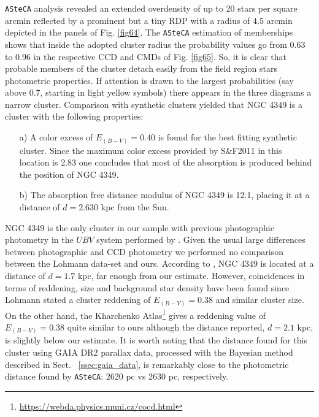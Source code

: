 \documentclass{aa}
\begin{document}
\texttt{ASteCA} analysis revealed an extended overdensity of up to 20 stars per
square arcmin reflected by a prominent but a tiny RDP with a radius of 4.5
arcmin depicted in the panels of Fig. \ref{fig64}.
The \texttt{ASteCA} estimation of memberships shows that inside the adopted
cluster radius the probability values go from 0.63 to 0.96 in the respective CCD
and CMDs of Fig. \ref{fig65}. So, it is clear that probable members of the
cluster detach easily from the field region stars photometric properties. If
attention is drawn to the largest probabilities (say above 0.7, starting in
light yellow symbols) there appears in the three diagrams a narrow cluster.
Comparison with synthetic clusters yielded
that NGC 4349 is a cluster with the following properties:

\begin{itemize}
    \item [a)] A color excess of $E_{(B-V)}= 0.40$ is found for the best fitting
    synthetic cluster. Since the maximum color excess provided by
    S\&F2011 in this location is 2.83 one concludes that most of the
    absorption is produced behind the position of NGC 4349.
    \item [b)] The absorption free distance modulus of NGC 4349 is 12.1,
    placing it at a distance of $d=2.630$ kpc from the Sun. 
\end{itemize}

NGC 4349 is the only cluster in our sample with previous photographic photometry
in the $UBV$ system performed by \cite{Lohmann_1961}. Given the usual large
differences between photographic and CCD photometry we performed no comparison
between the Lohmann data-set and ours. According to \cite{Lohmann_1961}, NGC
4349 is located at a distance of $d=1.7$ kpc, far enough from our estimate.
However, coincidences in terms of reddening, size and background star density
have been found since Lohmann stated a cluster reddening of $E_{(B-V)}=0.38$
and similar cluster size. On the other hand, the Kharchenko
Atlas\footnote{\url{https://webda.physics.muni.cz/cocd.html}}
\citep{Kharchenko_2005} gives a reddening value of $E_{(B-V)} = 0.38$ quite
similar to ours although the distance reported, $d=2.1$ kpc, is slightly below
our estimate.
It is worth noting that the distance found for this cluster using GAIA DR2
parallax data, processed with the Bayesian method described in Sect.~
\ref{ssec:gaia_data}, is remarkably close to the photometric distance found by 
\texttt{ASteCA}: 2620 pc vs 2630 pc, respectively.
\end{document}
